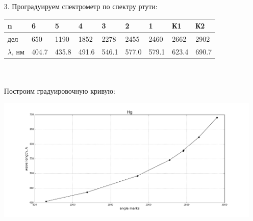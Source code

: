 \documentclass[12pt]{report}
\begin{document}
\begin{enumerate}




\item[3.] Проградуируем спектрометр по спектру ртути:

{
    \centering
    \begin{tabularx}{0.937\textwidth}{|X|X|X|X|X|X|X|X|X|}
        \hline
        n & 6 & 5 & 4 & 3 & 2 & 1 & К1 & К2 \\
        \hline
        дел & 650 & 1190 & 1852 & 2278 & 2455 & 2460 & 2662 & 2902 \\
        \hline
        $\lambda$, нм & 404.7 & 435.8 & 491.6 & 546.1 & 577.0 & 579.1 & 623.4 & 690.7 \\
        \hline
    \end{tabularx}
}
\\
\\

Построим градуировочную кривую:

\includegraphics[width=0.94 \textwidth]{g1_rtut.png}



\end{enumerate}
\end{document}
